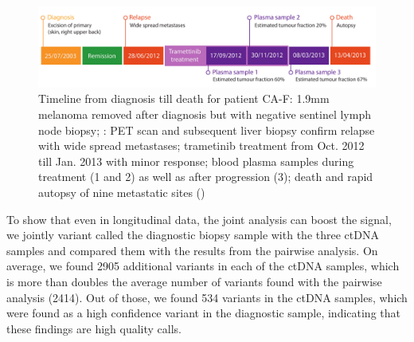 \begin{figure}[!ht]
\centering
\includegraphics[width=.99\linewidth]{Figures/CA-F_timeline.pdf}
\caption[Timeline from diagnosis till death for patient CA-F]{Timeline from diagnosis till death for patient CA-F: 1.9mm melanoma removed after diagnosis \dateenglish{} but with negative sentinel lymph node biopsy; \dateenglish{}: PET scan and subsequent liver biopsy confirm relapse with wide spread metastases; trametinib treatment from Oct. 2012 till Jan. 2013 with minor response; blood plasma samples during treatment (1 and 2) as well as after progression (3); death and rapid autopsy of nine metastatic sites (\dateenglish{})}\label{fig:CA-Ftimeline}
\end{figure}


To show that even in longitudinal data, the joint analysis can boost the signal, we jointly variant called the diagnostic biopsy sample with the three ctDNA samples and compared them with the results from the pairwise analysis. On average, we found 2905 additional variants in each of the ctDNA samples, which is more than doubles the average number of variants found with the pairwise analysis (2414). Out of those, we found 534 variants in the ctDNA samples, which were found as a high confidence variant in the diagnostic sample, indicating that these findings are high quality calls. 


